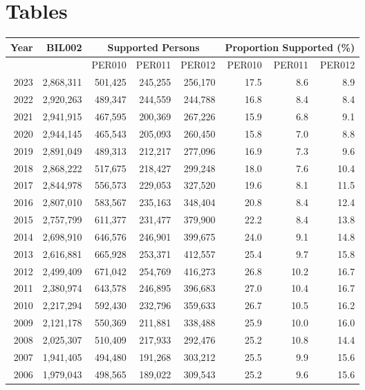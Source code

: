 \newpage
\section{Tables}
\renewcommand{\thetable}{\thesection \arabic{table}}
\setcounter{table}{0}

\begin{table}[H]
\centering
\begin{tabular}{rrrrrrrr}
\toprule
Year & BIL002 & \multicolumn{3}{|c|}{Supported Persons} & \multicolumn{3}{c}{Proportion Supported (\%)} \\
\midrule
 & & PER010 & PER011 & PER012 & PER010 & PER011 & PER012 \\
\midrule
2023 & 2,868,311 & 501,425 & 245,255 & 256,170 & 17.5 & 8.6 & 8.9 \\
2022 & 2,920,263 & 489,347 & 244,559 & 244,788 & 16.8 & 8.4 & 8.4 \\
2021 & 2,941,915 & 467,595 & 200,369 & 267,226 & 15.9 & 6.8 & 9.1 \\
2020 & 2,944,145 & 465,543 & 205,093 & 260,450 & 15.8 & 7.0 & 8.8 \\
2019 & 2,891,049 & 489,313 & 212,217 & 277,096 & 16.9 & 7.3 & 9.6 \\
2018 & 2,868,222 & 517,675 & 218,427 & 299,248 & 18.0 & 7.6 & 10.4 \\
2017 & 2,844,978 & 556,573 & 229,053 & 327,520 & 19.6 & 8.1 & 11.5 \\
2016 & 2,807,010 & 583,567 & 235,163 & 348,404 & 20.8 & 8.4 & 12.4 \\
2015 & 2,757,799 & 611,377 & 231,477 & 379,900 & 22.2 & 8.4 & 13.8 \\
2014 & 2,698,910 & 646,576 & 246,901 & 399,675 & 24.0 & 9.1 & 14.8 \\
2013 & 2,616,881 & 665,928 & 253,371 & 412,557 & 25.4 & 9.7 & 15.8 \\
2012 & 2,499,409 & 671,042 & 254,769 & 416,273 & 26.8 & 10.2 & 16.7 \\
2011 & 2,380,974 & 643,578 & 246,895 & 396,683 & 27.0 & 10.4 & 16.7 \\
2010 & 2,217,294 & 592,430 & 232,796 & 359,633 & 26.7 & 10.5 & 16.2 \\
2009 & 2,121,178 & 550,369 & 211,881 & 338,488 & 25.9 & 10.0 & 16.0 \\
2008 & 2,025,307 & 510,409 & 217,933 & 292,476 & 25.2 & 10.8 & 14.4 \\
2007 & 1,941,405 & 494,480 & 191,268 & 303,212 & 25.5 & 9.9 & 15.6 \\
2006 & 1,979,043 & 498,565 & 189,022 & 309,543 & 25.2 & 9.6 & 15.6 \\

\end{tabular}
\end{table}
